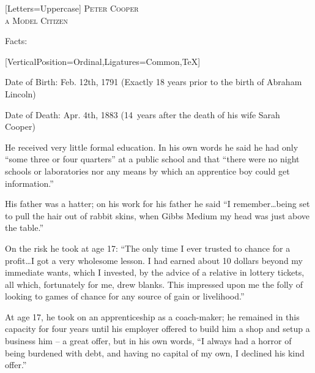 \documentclass{article}
\begin{document}
\centering
{}[Letters=Uppercase]
\fontsize{0.8in}{0.6in}\selectfont
\scshape 
{} Peter Cooper \\
 a Model Citizen

\vspace{0.1in}

\fontsize{18pt}{18pt}\selectfont
{}
\justify
Facts:

\vspace{0.1in}

\begin{minipage}[t]{0.45\linewidth}
[VerticalPosition=Ordinal,Ligatures={Common,TeX}]
\fontsize{11pt}{13pt}\selectfont
\raggedright
\upshape
\begin{enumList}

\item Date of Birth: Feb. 12th, 1791 (Exactly 18 years prior to the birth of
{ Abraham Lincoln})

\item Date of Death: Apr. 4th, 1883 (14~years after the death of his wife
{ Sarah Cooper})

\item He received { very little formal education}. In his
own words he said he had
only ``some three or four quarters'' at a public school and that ``there were no
night schools or laboratories nor any means by which an apprentice boy could get
information.''

\item His father was a hatter; on his work for his father he said ``I
remember\ldots being set to pull the hair out of rabbit skins, when {\fontspec
{Gibbs Medium} my head was just above the table}.''

\item On the risk he took at age 17: ``The only time I ever trusted to chance
for a profit\ldots I got a very wholesome lesson. I had earned about 10 dollars
beyond my immediate wants, which I invested, by the advice of a relative in
lottery tickets, all which, fortunately for me, drew blanks. This impressed
upon me the { folly of looking to games of chance} for any
source of gain or livelihood.''

\item At age 17, he took on an apprenticeship as a coach-maker; he remained in
this capacity for four years until his employer offered to build him a shop and
setup a business him -- a great offer, but in his own words, ``I always had a
{ horror of being burdened with debt}, and having no
capital of my own, { I declined his kind offer}.''


\end{enumList}
\end{minipage}
\end{document}
